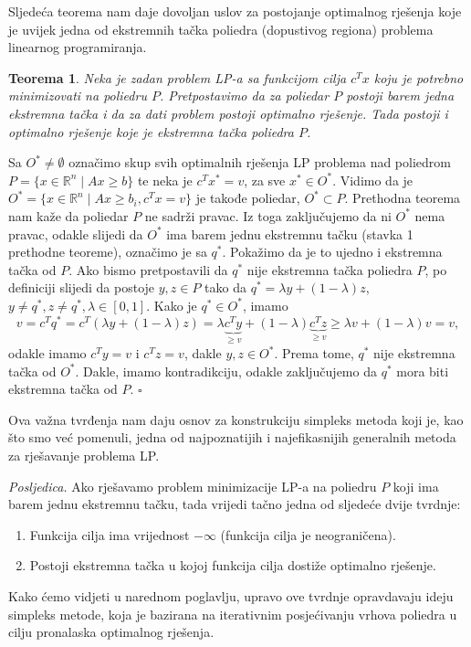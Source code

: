 \documentclass[a4paper, utf8, 11pt, colorlinks]{book}
\newtheorem{thm}{Teorema}
\newenvironment{proof}{{Dokaz:}}{\hfill$\square$}
\begin{document}
Sljedeća teorema nam daje dovoljan uslov za postojanje optimalnog rješenja koje je uvijek jedna od ekstremnih tačka poliedra (dopustivog regiona) problema linearnog programiranja.

\begin{thm}
   Neka je zadan problem LP-a sa funkcijom cilja $c^Tx$ koju je potrebno minimizovati na poliedru $P$. Pretpostavimo da za poliedar $P$ postoji barem jedna ekstremna tačka i da za dati problem postoji optimalno rješenje. Tada postoji i optimalno rješenje koje je ekstremna tačka poliedra $P$.
\end{thm}

\begin{proof}
         Sa $O^* \not = \emptyset$ označimo skup svih optimalnih rješenja LP problema nad poliedrom $P= \{ x \in \mathbb{R}^n \mid A x \geq b \}$ te neka je $c^T x^* = v$, za sve $x^* \in O^*$. Vidimo da je 
         $O^* = \{ x \in \mathbb{R}^n \mid A x \geq b_i, c^T x = v  \}$ je takođe poliedar, $O^* \subset P$. Prethodna teorema nam kaže da poliedar $P$ ne sadrži pravac. Iz toga zaključujemo da ni $O^*$ nema pravac, odakle slijedi da $O^*$ ima barem jednu ekstremnu tačku (stavka 1 prethodne teoreme), označimo je sa $q^*$. Pokažimo da je to ujedno i ekstremna tačka od $P$.  Ako bismo pretpostavili da $q^*$ nije ekstremna tačka poliedra $P$, po definiciji slijedi da postoje $y, z \in P$ tako da $q^* = \lambda y + ( 1 - \lambda ) z $, $y \neq q^*, z \neq q^*, \lambda \in [0, 1]$. Kako je $q^* \in O^*$, imamo 
         $$ v = c^T q^* = c^T (  \lambda y + ( 1 - \lambda ) z ) = \lambda 
        \underbrace{ c^T y}_{ \geq v} + ( 1 - \lambda ) \underbrace{c^T z}_{\geq v} \geq \lambda v + (1 - \lambda) v = v,$$
        odakle imamo $c^T y = v$ i $c^T z = v$, dakle $y, z \in O^*$. Prema tome, $q^*$ nije ekstremna tačka od $O^*$. Dakle, imamo kontradikciju, odakle zaključujemo da $q^*$ mora biti  ekstremna tačka od  $P$.
\end{proof}
 
 Ova važna tvrđenja nam daju osnov za konstrukciju simpleks metoda koji je, kao što smo već pomenuli, jedna od najpoznatijih i najefikasnijih generalnih metoda za rješavanje problema LP.
 
 \emph{Posljedica.} Ako  rješavamo problem minimizacije LP-a na poliedru $P$ koji ima barem jednu ekstremnu tačku, tada vrijedi tačno jedna od sljedeće dvije tvrdnje:
   \begin{enumerate}
       \item Funkcija cilja ima vrijednost $- \infty$ (funkcija cilja je neograničena).
       \item Postoji ekstremna tačka u kojoj funkcija cilja dostiže optimalno rješenje. 
   \end{enumerate}
Kako ćemo vidjeti u narednom poglavlju, upravo  ove tvrdnje opravdavaju ideju simpleks metode, koja je bazirana na iterativnim posjećivanju vrhova poliedra 
u cilju pronalaska optimalnog rješenja.
\end{document}
